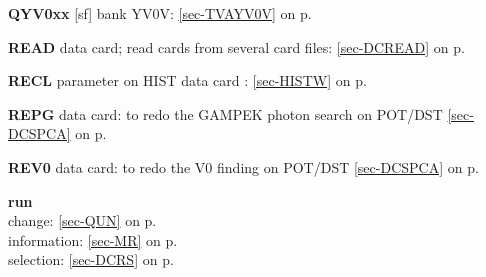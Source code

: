  \item{\bf QYV0xx  }[sf] bank YV0V: \ref{sec-TVAYV0V} on p.~\pageref{sec-TVAYV0V}
 
 \item{\bf READ    }data card; read cards from several card
 files: \ref{sec-DCREAD} on p.~\pageref{sec-DCREAD}\\
 \item{\bf RECL    }parameter on HIST data card : \ref{sec-HISTW} on p.~\pageref{sec-HISTW}\\
 \item{\bf REPG    }data card: to redo the GAMPEK photon search on POT/DST
 \ref{sec-DCSPCA} on p.~\pageref{sec-DCSPCA}\\
 \item{\bf REV0    }data card: to redo the V0 finding on POT/DST
 \ref{sec-DCSPCA} on p.~\pageref{sec-DCSPCA}\\
 \item{\bf run }\\
 \subitem change: \ref{sec-QUN} on p.~\pageref{sec-QUN}\\
 \subitem information: \ref{sec-MR} on p.~\pageref{sec-MR}\\
 \subitem selection: \ref{sec-DCRS} on p.~\pageref{sec-DCRS}
 
